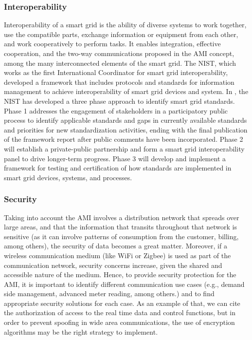 \documentclass[11pt,draftclsnofoot,onecolumn]{IEEEtran}
\begin{document}
\subsubsection{Interoperability}
Interoperability of a smart grid is the ability of diverse systems to work together, use the compatible parts, exchange information or equipment from each other, and work cooperatively to perform tasks. It enables integration, effective cooperation, and the two-way communications proposed in the AMI concept, among the many interconnected elements of the smart grid. The NIST, which works as the first International Coordinator for smart grid interoperability, developed a framework that includes protocols and standards for information management to achieve interoperability of smart grid devices and system. In \cite{NIST2010}, the NIST has developed a three phase approach to identify smart grid standards. Phase 1 addresses the engagement of stakeholders in a participatory public process to identify applicable standards and gaps in currently available standards and priorities for new standardization activities, ending with the final publication of the framework report after public comments have been incorporated. Phase 2 will establish a private-public partnership and form a smart grid interoperability panel to drive longer-term progress. Phase 3 will develop and implement a framework for testing and certification of how standards are implemented in smart grid devices, systems, and processes.

\subsubsection{Security}
Taking into account the AMI involves a distribution network that spreads over large areas, and that the information that transits throughout that network is sensitive (as it can involve patterns of consumption from the customer, billing, among others), the security of data becomes a great matter. Moreover, if a wireless communication medium (like WiFi or Zigbee) is used as part of the communication network, security concerns increase, given the shared and accessible nature of the medium. Hence, to provide security protection for the AMI, it is important to identify different communication use cases (e.g., demand side management, advanced meter reading, among others.) and to find appropriate security solutions for each case. As an example of that, we can cite the authorization of access to the real time data and control functions, but in order to prevent spoofing in wide area communications, the use of encryption algorithms may be the right strategy to implement. 
\end{document}
